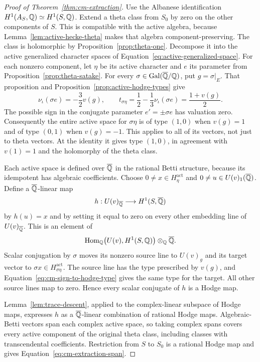 \begin{proof}[Proof of Theorem~\ref{thm:cm-extraction}]
Use the Albanese identification
\(H^1(A_S,\mathbb{Q})\simeq H^1(S,\mathbb{Q})\). Extend a theta class from \(S_0\)
by zero on the other components of \(S\). This is compatible with
the active algebra, because Lemma~\ref{lem:active-hecke-theta}
makes that algebra component-preserving. The class is holomorphic
by Proposition~\ref{prop:theta-one}. Decompose it into the active
generalized character spaces of
Equation~\eqref{eq:active-generalized-space}. For each nonzero component,
let \(\eta\) be its active character and \(e\) its parameter from
Proposition~\ref{prop:theta-satake}. For every
\(\sigma\in\operatorname{Gal}(\overline{\mathbb{Q}}/\mathbb{Q})\), put \(g=\sigma|_E\). That proposition
and Proposition~\ref{prop:active-hodge-types} give
\begin{equation}\label{eq:cm-sign-to-hodge-type}
\nu_\iota(\sigma e)=-\frac32v(g),\qquad
t_{\sigma\eta}
=\frac12-\frac13\nu_\iota(\sigma e)
=\frac{1+v(g)}2.
\end{equation}
The possible sign in the conjugate parameter \(e'=\pm\sigma e\)
has valuation zero. Consequently the entire active space for
\(\sigma\eta\) is of type \((1,0)\) when \(v(g)=1\) and of type
\((0,1)\) when \(v(g)=-1\). This applies to all of its vectors,
not just to theta vectors. At the identity it gives type \((1,0)\),
in agreement with \(v(1)=1\) and the holomorphy of the theta class.

Each active space is defined over \(\overline{\mathbb{Q}}\) in the rational Betti
structure, because its idempotent has algebraic coefficients.
Choose \(0\ne x\in H^{\mathrm{act}}_\eta\) and
\(0\ne u\in U(v)_1(\overline{\mathbb{Q}})\). Define a \(\overline{\mathbb{Q}}\)-linear map
\[
h:U(v)_{\overline{\mathbb{Q}}}\longrightarrow H^1(S,\overline{\mathbb{Q}})
\]
by \(h(u)=x\) and by setting it equal to zero on every other
embedding line of \(U(v)_{\overline{\mathbb{Q}}}\). This is an element of
\[
\operatorname{Hom}_{\mathbb{Q}}\bigl(U(v),H^1(S,\mathbb{Q})\bigr)\otimes_{\mathbb{Q}}\overline{\mathbb{Q}}.
\]
Scalar conjugation by \(\sigma\) moves its nonzero source line to
\(U(v)_g\) and its target vector to
\(\sigma x\in H^{\mathrm{act}}_{\sigma\eta}\). The source line has
the type prescribed by \(v(g)\), and
Equation~\eqref{eq:cm-sign-to-hodge-type} gives the same type for
the target. All other source lines map to zero. Hence every scalar
conjugate of \(h\) is a Hodge map.

Lemma~\ref{lem:trace-descent}, applied to the complex-linear
subspace of Hodge maps, expresses \(h\) as a \(\overline{\mathbb{Q}}\)-linear
combination of rational Hodge maps. Algebraic-Betti vectors span
each complex active space, so taking complex spans covers every
active component of the original theta class, including classes
with transcendental coefficients. Restriction from \(S\) to
\(S_0\) is a rational Hodge map and gives
Equation~\eqref{eq:cm-extraction-span}.


\end{proof}
